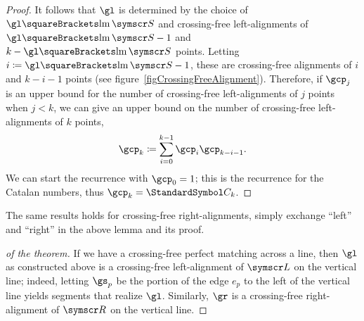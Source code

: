 \documentclass[10pt, a4paper, twoside]{basestyle}
\DeclareMathOperator{\leftmost}{lm}
\newcommand{\CatalanNumber}[1]{\StandardSymbol C_{#1}}
\newcommand{\pointset}{\symscr}
\begin{document}
\begin{lemma}
\begin{proof}
It follows that $\gl$ is determined by the choice of $\gl\of {\leftmost\pointset S}$
and crossing-free left-align\-ments
of $\gl\of{\leftmost\pointset S}-1$ and $k-\gl\of{\leftmost\pointset S}$ points.
Letting $i\DefineAs \gl\of {\leftmost\pointset S} - 1$, these are crossing-free alignments of $i$ and $k-i-1$ points (see
figure~\ref{figCrossingFreeAlignment}).
Therefore, if $\gcp_j$ is an upper bound for the number of crossing-free
left-alignments of $j$ points when $j < k$,
we can give an upper bound on the number of crossing-free left-alignments of $k$ points,
\[\gcp_k\DefineAs\sum{i=0}[k-1]\gcp_{i}\gcp_{k-i-1}\text.\]
We can start the recurrence with $\gcp_0 = 1$; this is the recurrence for the Catalan numbers, thus
$\gcp_k=\CatalanNumber k$.
\end{proof}
\end{lemma}
The same results holds for crossing-free right-alignments, simply exchange ``left'' and ``right'' in the above
lemma and its proof.

\begin{proof}[of the theorem]
If we have a crossing-free perfect matching across a line, then $\gl$ as constructed above is a crossing-free
left-alignment of $\pointset L$ on the vertical line; indeed, letting $\gs_p$ be the portion of the edge $e_p$
to the left of the vertical line yields segments that realize $\gl$.
Similarly, $\gr$ is a crossing-free right-alignment of $\pointset R$ on the vertical line.
\end{proof}
\end{document}
